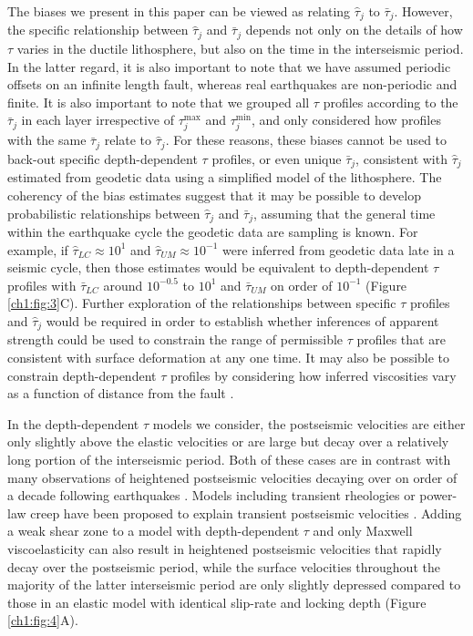 The biases we present in this paper can be viewed as relating
$\hat{\tau}_j$ to $\bar{\tau}_j$.  However, the specific relationship
between $\hat{\tau}_j$ and $\bar{\tau}_j$ depends not only on the
details of how $\tau$ varies in the ductile lithosphere, but also on
the time in the interseismic period. In the latter regard, it is also
important to note that we have assumed periodic offsets on an infinite
length fault, whereas real earthquakes are non-periodic and finite. It
is also important to note that we grouped all $\tau$ profiles
according to the $\bar{\tau}_j$ in each layer irrespective of
$\tau^{\max}_j$ and $\tau^{\min}_j$, and only considered how profiles
with the same $\bar{\tau}_j$ relate to $\hat{\tau}_j$.  For these
reasons, these biases cannot be used to back-out specific
depth-dependent $\tau$ profiles, or even unique $\bar{\tau}_j$,
consistent with $\hat{\tau}_j$ estimated from geodetic data using a
simplified model of the lithosphere.  The coherency of the bias
estimates suggest that it may be possible to develop probabilistic
relationships between $\hat{\tau}_j$ and $\bar{\tau}_j$, assuming that
the general time within the earthquake cycle the geodetic data are
sampling is known.  For example, if $\hat{\tau}_{LC} \approx 10^{1}$
and $\hat{\tau}_{UM} \approx 10^{-1}$ were inferred from geodetic data
late in a seismic cycle, then those estimates would be equivalent to
depth-dependent $\tau$ profiles with $\bar{\tau}_{LC}$ around
$10^{-0.5}$ to $10^{1}$ and $\bar{\tau}_{UM}$ on order of $10^{-1}$
(Figure \ref{ch1:fig:3}C). Further exploration of the relationships
between specific $\tau$ profiles and $\hat{\tau}_j$ would be required
in order to establish whether inferences of apparent strength could be
used to constrain the range of permissible $\tau$ profiles that are
consistent with surface deformation at any one time.  It may also be
possible to constrain depth-dependent $\tau$ profiles by considering
how inferred viscosities vary as a function of distance from the fault
\citep{Yamasaki2012}.

In the depth-dependent $\tau$ models we consider, the postseismic
velocities are either only slightly above the elastic velocities or
are large but decay over a relatively long portion of the interseismic
period. Both of these cases are in contrast with many observations of
heightened postseismic velocities decaying over on order of a decade
following earthquakes \citep[e.g.,][]{Ergintav2009}. Models including
transient rheologies or power-law creep have been proposed to explain
transient postseismic velocities \citep[e.g.,][]{Pollitz2003,
Freed2006b, Ryder2007}.  Adding a weak shear zone to a model with
depth-dependent $\tau$ and only Maxwell viscoelasticity can also
result in heightened postseismic velocities that rapidly decay over
the postseismic period, while the surface velocities throughout the
majority of the latter interseismic period are only slightly depressed
compared to those in an elastic model with identical slip-rate and
locking depth (Figure \ref{ch1:fig:4}A).


